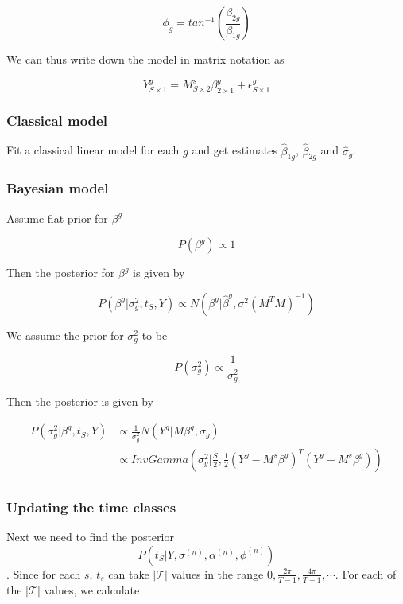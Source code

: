 \documentclass[11pt]{article}
\begin{document}
$$ \phi_g = tan^{-1}  \left (\frac{\beta_{2g}}{\beta_{1g}} \right ) $$

We can thus write down the model in matrix notation as

$$ Y^{g}_{S \times 1} = M^{s}_{S \times 2}  \beta^{g}_{2 \times 1} + \epsilon^{g}_{S \times 1} $$

\subsubsection{Classical model}

Fit a classical linear model for each $g$ and get estimates $\hat{\beta}_{1g}$, $\hat{\beta}_{2g}$ and $\hat{\sigma}_{g}$.

\subsubsection{Bayesian model}

Assume flat prior for $\beta^g$

$$ P(\beta^{g}) \propto 1 $$

Then the posterior for $\beta^g$ is given by

$$ P(\beta^{g} | \sigma^2_g, t_S, Y ) \propto N(\beta^{g} | \hat{\beta}^{g}, \sigma^2 (M^{T}M)^{-1}) $$

We assume the prior for $\sigma^2_{g}$ to be

$$ P(\sigma^2_{g}) \propto \frac{1}{\sigma^2_{g}} $$

Then the posterior is given by

\begin{align*}
P(\sigma^2_{g} | \beta^{g}, t_{S}, Y) & \propto  \frac{1}{\sigma^2_{g}} N \left ( Y^{g} | M \beta^{g}, \sigma_{g}  \right)  \\
\qquad  &  \propto InvGamma \left ( \sigma^{2}_{g} | \frac{S}{2}, \frac{1}{2} (Y^{g} - M^{s}\beta^{g})^{T} (Y^{g} - M^{s}\beta^{g}) \right) \\
\end{align*}

\subsubsection{Updating the time classes}

Next we need to find the posterior $$ P(t_S | Y, \sigma^{(n)}, \alpha^{(n)}, \phi^{(n)}) $$. Since for each $s$, $t_s$ can take $ | \mathcal{T} | $ values in the range $0, \frac{2 \pi}{T-1},  \frac{4 \pi}{T-1}, \cdots $. For each of the $| \mathcal{T} |$ values, we calculate
\end{document}
